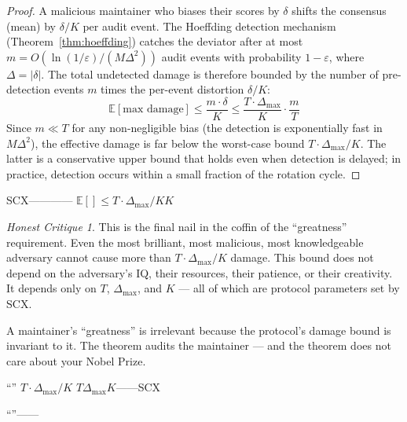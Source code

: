 \documentclass[12pt,a4paper]{article}
\theoremstyle{remark}
\newcommand{\E}{\mathbb{E}}
\newtheorem{honesthit}{Honest Critique}[section]
\newenvironment{hitbox}{%
  \begin{center}
  \color{red}
  \begin{minipage}{0.92\textwidth}
  \begin{honesthit}
}{%
  \end{honesthit}
  \end{minipage}
  \end{center}
}
\begin{document}
\begin{proof}
A malicious maintainer who biases their scores by $\delta$ shifts the consensus
(mean) by $\delta/K$ per audit event. The Hoeffding detection mechanism
(Theorem~\ref{thm:hoeffding}) catches the deviator after at most
$m = O(\ln(1/\varepsilon) / (M\Delta^2))$ audit events with probability
$1 - \varepsilon$, where $\Delta = |\delta|$. The total undetected damage
is therefore bounded by the number of pre-detection events $m$ times the
per-event distortion $\delta/K$:
\begin{equation}
    \E[\text{max damage}] \leq \frac{m \cdot \delta}{K}
    \leq \frac{T \cdot \Delta_{\max}}{K} \cdot \frac{m}{T}
\end{equation}
Since $m \ll T$ for any non-negligible bias (the detection is exponentially
fast in $M\Delta^2$), the effective damage is far below the worst-case bound
$T \cdot \Delta_{\max} / K$. The latter is a conservative upper bound that
holds even when detection is delayed; in practice, detection occurs within
a small fraction of the rotation cycle.
\end{proof}

\noindent\textbf{}
SCX————
$\E[\text{}] \leq T \cdot \Delta_{\max} / K$$K$


\begin{hitbox}
This is the final nail in the coffin of the ``greatness'' requirement. Even the
most brilliant, most malicious, most knowledgeable adversary cannot cause more
than $T \cdot \Delta_{\max} / K$ damage. This bound does not depend on the
adversary's IQ, their resources, their patience, or their creativity. It depends
only on $T$, $\Delta_{\max}$, and $K$ — all of which are protocol parameters
set by SCX.

A maintainer's ``greatness'' is irrelevant because the protocol's damage bound
is invariant to it. The theorem audits the maintainer — and the theorem does not
care about your Nobel Prize.

\begin{center}
\small\textbf{}
“”
$T \cdot \Delta_{\max} / K$
$T$$\Delta_{\max}$$K$——SCX

“”——

\end{center}
\end{hitbox}

\newpage

\end{document}

